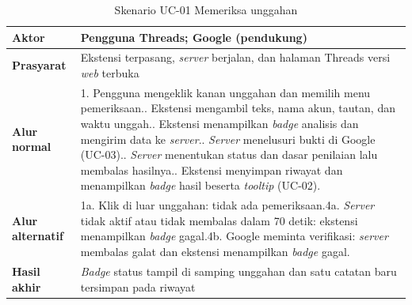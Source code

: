 \documentclass[12pt,a4paper,twoside]{report}
\begin{document}
\begin{table}[H]
  \centering
  \caption{Skenario UC-01 Memeriksa unggahan}
  \label{tab:skn1}
  \begin{spacing}{1.0}
  \normalsize
  \setlength{\extrarowheight}{2pt}
  \begin{tabular}{|R{3.0cm}|R{9.6cm}|}
    \hline
    \textbf{Aktor} & Pengguna Threads; Google (pendukung) \\ \hline
    \textbf{Prasyarat} & Ekstensi terpasang, \textit{server} berjalan, dan halaman Threads versi \textit{web} terbuka \\ \hline
    \textbf{Alur normal} & 1. Pengguna mengeklik kanan unggahan dan memilih menu pemeriksaan.. Ekstensi mengambil teks, nama akun, tautan, dan waktu unggah.. Ekstensi menampilkan \textit{badge} analisis dan mengirim data ke \textit{server}.. \textit{Server} menelusuri bukti di Google (UC-03).. \textit{Server} menentukan status dan dasar penilaian lalu membalas hasilnya.. Ekstensi menyimpan riwayat dan menampilkan \textit{badge} hasil beserta \textit{tooltip} (UC-02). \\ \hline
    \textbf{Alur alternatif} & 1a. Klik di luar unggahan: tidak ada pemeriksaan.\newline 4a. \textit{Server} tidak aktif atau tidak membalas dalam 70 detik: ekstensi menampilkan \textit{badge} gagal.\newline 4b. Google meminta verifikasi: \textit{server} membalas galat dan ekstensi menampilkan \textit{badge} gagal. \\ \hline
    \textbf{Hasil akhir} & \textit{Badge} status tampil di samping unggahan dan satu catatan baru tersimpan pada riwayat \\ \hline
  \end{tabular}
  \end{spacing}
\end{table}
\end{document}
